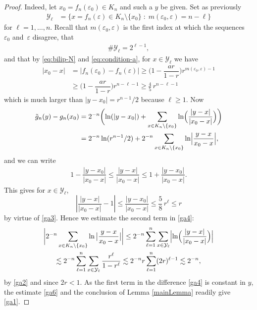 \documentclass[10pt]{amsart}
\numberwithin{equation}{section}
\theoremstyle{plain}
\theoremstyle{definition}
\newcommand{\cY}{{\mathcal Y}}
\begin{document}
\begin{proof}
Indeed, let $x_0 = f_n(\varepsilon_0) \in K_n$ and such a $y$ be given.
Set as previously
\begin{align*}
\cY_\ell & = \{ x = f_n(\varepsilon) \in K_n \setminus \{x_0\} \; : \; m(\varepsilon_0, \varepsilon) = n-\ell\} %
\end{align*}
for $\ell=1,\dots , n$.
Recall that $m(\varepsilon_0, \varepsilon)$ is the first index at which the sequences~$\varepsilon_0$ and~$\varepsilon$ disagree, that
\begin{align}
\# \cY_\ell = 2^{\ell-1}, \label{ga2}
\end{align}
and that by \eqref{eq:bilip-N} and \eqref{eq:condition-a}, for $x \in \cY_\ell$ we have
\begin{align} \label{ga3}
|x_0 - x| &= |f_n(\varepsilon_0) - f_n(\varepsilon)|
\ge \Big ( 1 - \dfrac{ar}{1-r} \Big )r^{m(\varepsilon_0, \varepsilon)-1}
\nonumber
\\ & \ge \Big ( 1 - \dfrac{ar}{1-r} \Big )r^{n-\ell-1}
\geq \frac45 \, r^{n-\ell-1}
\end{align}
which is much larger than $|y-x_0| = r^{n-1}/2$ because $\ell \geq 1$.
Now
\begin{equation}\label{ga4}
\begin{aligned}
\tilde{g}_n(y) - g_n(x_0) & = 2^{-n} \biggl( \ln(|y-x_0|) + \sum_{x \in K_n \setminus \{x_0\}} \ln \Bigl ( \dfrac{|y-x|}{|x_0-x|} \Bigr) \biggr) \\
& = 2^{-n} \ln(r^{n-1}/2) + 2^{-n}\sum_{x \in K_n \setminus \{x_0\}} \ln \Bigl |\dfrac{y-x}{x_0-x} \Bigr |,
\end{aligned}
\end{equation}
and we can write
\begin{align*}
1 - \dfrac{|y-x_0|}{|x_0-x|} \le \dfrac{\left |y-x \right |}{\left| x_0-x \right| }
\le 1 + \dfrac{|y-x_0|}{|x_0-x|}.
\end{align*}
This gives for $x \in \cY_\ell$,
\begin{equation}
\left | \dfrac{|y-x|}{|x_0-x|} -1 \right| \le \dfrac{|y-x_0|}{|x_0-x|}
\leq \frac58 \, r^{\ell} \leq r
\label{ga5}
\end{equation}
by virtue of \eqref{ga3}. Hence we estimate the second term in \eqref{ga4}:
\begin{multline} \label{ga6}
\biggl |2^{-n}\sum_{x \in K_n \setminus \{x_0\}}\ln \big|\dfrac{y-x}{x_0-x} \big | \biggr |
\le 2^{-n} \sum_{\ell =1}^n \sum_{x \in \cY_\ell }
\Bigl| \ln \Bigl( \dfrac{|y-x|}{|x_0-x|} \Bigr) \Bigr | \\
\lesssim 2^{-n} \sum_{\ell=1}^n \sum_{x \in \cY_\ell} \dfrac{ r^{\ell}}{1-r^{\ell}}
\lesssim 2^{-n}r \sum_{\ell=1}^n (2r)^{\ell-1}
\lesssim 2^{-n},
\end{multline}
by \eqref{ga2} and since $2r <1$. As the first term in the difference \eqref{ga4} is constant in $y$, the estimate \eqref{ga6} and the conclusion of Lemma \ref{mainLemma} readily give \eqref{ga1}.


\end{proof}
\end{document}

